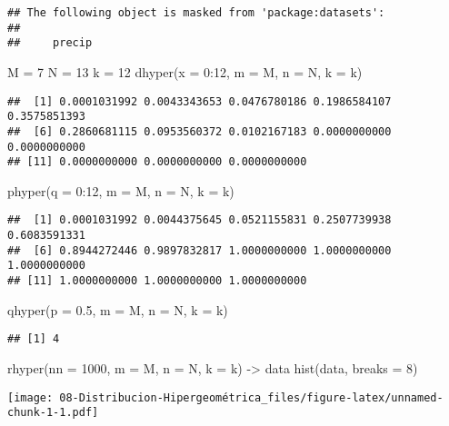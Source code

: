 \documentclass[
]{article}
\newenvironment{Shaded}{\begin{snugshade}}{\end{snugshade}}
\newcommand{\AttributeTok}[1]{\textcolor[rgb]{0.77,0.63,0.00}{#1}}
\newcommand{\DecValTok}[1]{\textcolor[rgb]{0.00,0.00,0.81}{#1}}
\newcommand{\FloatTok}[1]{\textcolor[rgb]{0.00,0.00,0.81}{#1}}
\newcommand{\FunctionTok}[1]{\textcolor[rgb]{0.00,0.00,0.00}{#1}}
\newcommand{\NormalTok}[1]{#1}
\newcommand{\OtherTok}[1]{\textcolor[rgb]{0.56,0.35,0.01}{#1}}
\newcommand{\SpecialCharTok}[1]{\textcolor[rgb]{0.00,0.00,0.00}{#1}}
\begin{document}
\begin{verbatim}
## The following object is masked from 'package:datasets':
## 
##     precip
\end{verbatim}

\begin{Shaded}
\begin{Highlighting}[]
\NormalTok{M }\OtherTok{=} \DecValTok{7}
\NormalTok{N }\OtherTok{=} \DecValTok{13}
\NormalTok{k }\OtherTok{=} \DecValTok{12}
\FunctionTok{dhyper}\NormalTok{(}\AttributeTok{x =} \DecValTok{0}\SpecialCharTok{:}\DecValTok{12}\NormalTok{, }\AttributeTok{m =}\NormalTok{ M, }\AttributeTok{n =}\NormalTok{ N, }\AttributeTok{k =}\NormalTok{ k)}
\end{Highlighting}
\end{Shaded}

\begin{verbatim}
##  [1] 0.0001031992 0.0043343653 0.0476780186 0.1986584107 0.3575851393
##  [6] 0.2860681115 0.0953560372 0.0102167183 0.0000000000 0.0000000000
## [11] 0.0000000000 0.0000000000 0.0000000000
\end{verbatim}

\begin{Shaded}
\begin{Highlighting}[]
\FunctionTok{phyper}\NormalTok{(}\AttributeTok{q =} \DecValTok{0}\SpecialCharTok{:}\DecValTok{12}\NormalTok{, }\AttributeTok{m =}\NormalTok{ M, }\AttributeTok{n =}\NormalTok{ N, }\AttributeTok{k =}\NormalTok{ k)}
\end{Highlighting}
\end{Shaded}

\begin{verbatim}
##  [1] 0.0001031992 0.0044375645 0.0521155831 0.2507739938 0.6083591331
##  [6] 0.8944272446 0.9897832817 1.0000000000 1.0000000000 1.0000000000
## [11] 1.0000000000 1.0000000000 1.0000000000
\end{verbatim}

\begin{Shaded}
\begin{Highlighting}[]
\FunctionTok{qhyper}\NormalTok{(}\AttributeTok{p =} \FloatTok{0.5}\NormalTok{, }\AttributeTok{m =}\NormalTok{ M, }\AttributeTok{n =}\NormalTok{ N, }\AttributeTok{k =}\NormalTok{ k)}
\end{Highlighting}
\end{Shaded}

\begin{verbatim}
## [1] 4
\end{verbatim}

\begin{Shaded}
\begin{Highlighting}[]
\FunctionTok{rhyper}\NormalTok{(}\AttributeTok{nn =} \DecValTok{1000}\NormalTok{, }\AttributeTok{m =}\NormalTok{ M, }\AttributeTok{n =}\NormalTok{ N, }\AttributeTok{k =}\NormalTok{ k) }\OtherTok{{-}\textgreater{}}\NormalTok{ data}
\FunctionTok{hist}\NormalTok{(data, }\AttributeTok{breaks =} \DecValTok{8}\NormalTok{)}
\end{Highlighting}
\end{Shaded}

\texttt{[image: 08-Distribucion-Hipergeométrica\_files/figure-latex/unnamed-chunk-1-1.pdf]}
\end{document}
